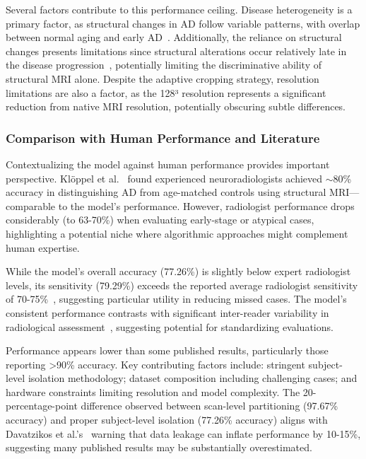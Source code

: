 \documentclass[11pt, a4paper]{article}
\begin{document}
Several factors contribute to this performance ceiling. Disease heterogeneity is a primary factor, as structural changes in AD follow variable patterns, with overlap between normal aging and early AD~\cite{vemuri2010role}. Additionally, the reliance on structural changes presents limitations since structural alterations occur relatively late in the disease progression~\cite{jack2013tracking}, potentially limiting the discriminative ability of structural MRI alone. Despite the adaptive cropping strategy, resolution limitations are also a factor, as the 128³ resolution represents a significant reduction from native MRI resolution, potentially obscuring subtle differences.

\subsubsection{Comparison with Human Performance and Literature}

Contextualizing the model against human performance provides important perspective. Klöppel et al.~\cite{kloppel2008accuracy} found experienced neuroradiologists achieved $\sim$80\% accuracy in distinguishing AD from age-matched controls using structural MRI—comparable to the model's performance. However, radiologist performance drops considerably (to 63-70\%) when evaluating early-stage or atypical cases, highlighting a potential niche where algorithmic approaches might complement human expertise.

While the model's overall accuracy (77.26\%) is slightly below expert radiologist levels, its sensitivity (79.29\%) exceeds the reported average radiologist sensitivity of 70-75\%~\cite{frisoni2010clinical}, suggesting particular utility in reducing missed cases. The model's consistent performance contrasts with significant inter-reader variability in radiological assessment~\cite{kloppel2008accuracy}, suggesting potential for standardizing evaluations.

Performance appears lower than some published results, particularly those reporting >90\% accuracy. Key contributing factors include: stringent subject-level isolation methodology; dataset composition including challenging cases; and hardware constraints limiting resolution and model complexity. The 20-percentage-point difference observed between scan-level partitioning (97.67\% accuracy) and proper subject-level isolation (77.26\% accuracy) aligns with Davatzikos et al.'s~\cite{davatzikos2019machine} warning that data leakage can inflate performance by 10-15\%, suggesting many published results may be substantially overestimated.
\end{document}
